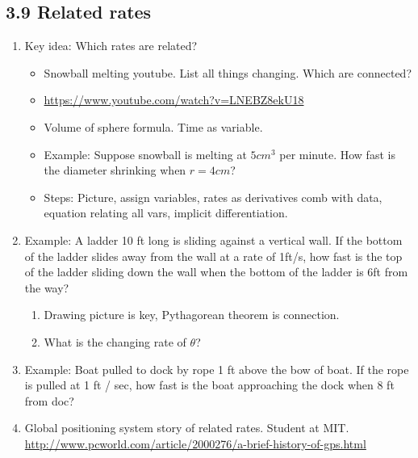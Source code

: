 \documentclass{article}
\begin{document}
\subsection{3.9 Related rates}
\begin{enumerate}

\item Key idea: Which rates are related?
\begin{itemize}
\item Snowball melting youtube. List all things changing. Which are connected?
\item \url{https://www.youtube.com/watch?v=LNEBZ8ekU18}
\item Volume of sphere formula. Time as variable.
\item Example: Suppose snowball is melting at $5 cm^3$ per minute. How fast is the diameter shrinking when $r=4cm$?
\item Steps: Picture, assign variables, rates as derivatives comb with data, equation relating all vars, implicit differentiation.
\end{itemize}

\item Example: A ladder 10 ft long is sliding against a vertical wall. If the bottom of the ladder slides away from the wall at a rate of 1ft/s, how fast is the top of the ladder sliding down the wall when the bottom of the ladder is 6ft from the way?
\begin{enumerate}
\item Drawing picture is key, Pythagorean theorem is connection.
\item What is the changing rate of $\theta$?
\end{enumerate}

\item Example: Boat pulled to dock by rope 1 ft above the bow of boat. If the rope is pulled at 1 ft / sec, how fast is the boat approaching the dock when 8 ft from doc?


\item Global positioning system story of related rates. Student at MIT. \url{http://www.pcworld.com/article/2000276/a-brief-history-of-gps.html}
\end{enumerate}

\end{document}
